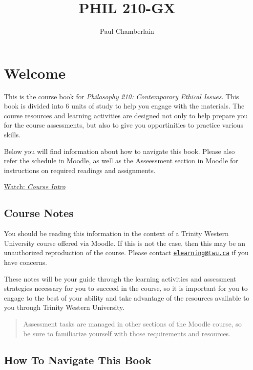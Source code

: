 \documentclass[
]{book}
\title{PHIL 210-GX}
\author{Paul Chamberlain}
\date{}
\begin{document}
\maketitle

{
\setcounter{tocdepth}{1}
\tableofcontents
}
\hypertarget{welcome}{%
\chapter*{Welcome}\label{welcome}}

This is the course book for \emph{Philosophy 210: Contemporary Ethical Issues}. This book is divided into 6 units of study to help you engage with the materials. The course resources and learning activities are designed not only to help prepare you for the course assessments, but also to give you opportinities to practice various skills.

Below you will find information about how to navigate this book. Please also refer the schedule in Moodle, as well as the Asseessment section in Moodle for instructions on required readings and assignments.

\href{https://vimeo.com/861410545/4fe37f1488}{Watch: \emph{Course Intro}}

\hypertarget{course-notes}{%
\section*{Course Notes}\label{course-notes}}

You should be reading this information in the context of a Trinity Western University course offered via Moodle. If this is not the case, then this may be an unauthorized reproduction of the course. Please contact \href{mailto:elearning@twu.ca}{\nolinkurl{elearning@twu.ca}} if you have concerns.

These notes will be your guide through the learning activities and assessment strategies necessary for you to succeed in the course, so it is important for you to engage to the best of your ability and take advantage of the resources available to you through Trinity Western University.

\begin{quote}
Assessment tasks are managed in other sections of the Moodle course, so be sure to familiarize yourself with those requirements and resources.
\end{quote}

\hypertarget{how-to-navigate-this-book}{%
\section*{How To Navigate This Book}\label{how-to-navigate-this-book}}
\end{document}
